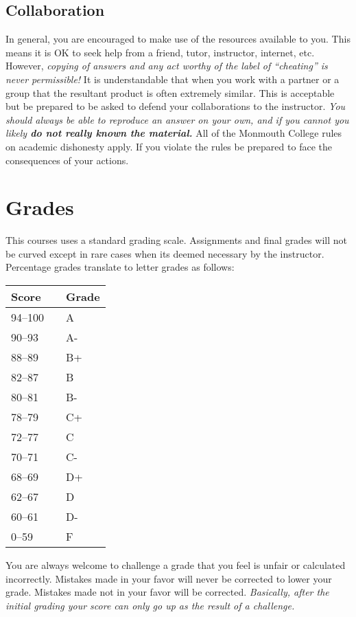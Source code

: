 \documentclass[10pt]{article}
\begin{document}
\subsection{Collaboration}

In general, you are encouraged to make use of the resources available to you.  This means it is OK to seek help from a friend, tutor, instructor, internet, etc.  However, \textit{copying of answers and any act worthy of the label of ``cheating'' is never permissible!}  It is understandable that when you work with a partner or a group that the resultant product is often extremely similar.  This is acceptable but be prepared to be asked to defend your collaborations to the instructor.  \textit{You should always be able to reproduce an answer on your own, and if you cannot you likely \textbf{do not really known the material.}} All of the Monmouth College rules on academic dishonesty apply.  If you violate the rules be prepared to face the consequences of your actions.

\section{Grades}

This courses uses a standard grading scale.  Assignments and final grades will not be curved except in rare cases when its deemed necessary by the instructor.  Percentage grades translate to letter grades as follows:

\begin{center}
\begin{small}
\begin{tabular}{lcl}
Score & & Grade \\ \toprule
94--100 & & A \\
90--93 & & A- \\
88--89 & & B+ \\
82--87 & & B \\
80--81 & & B- \\
78--79 & & C+ \\
72--77 & & C \\
70--71 & & C- \\
68--69 & & D+ \\
62--67 & & D \\
60--61 & & D- \\
0--59 & & F
\end{tabular}
\end{small}
\end{center}

You are always welcome to challenge a grade that you feel is unfair or calculated incorrectly.  Mistakes made in your favor will never be corrected to lower your grade.  Mistakes made not in your favor will be corrected.  \textit{Basically, after the initial grading your score can only go up as the result of a challenge.}
\end{document}
